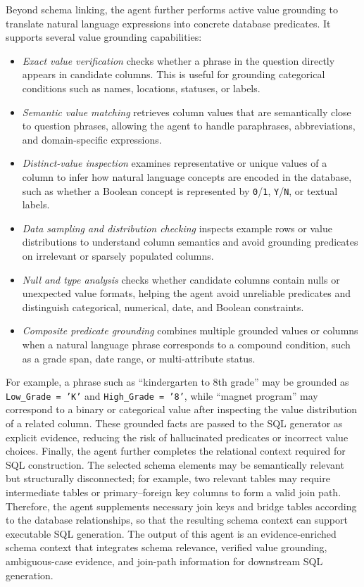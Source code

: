 Beyond schema linking, the agent further performs active value grounding to translate natural language expressions into concrete database predicates.
It supports several value grounding capabilities:

\begin{itemize}[leftmargin=10pt]
	\item \textit{Exact value verification} checks whether a phrase in the question directly appears in candidate columns.
	This is useful for grounding categorical conditions such as names, locations, statuses, or labels.
	
	\item \textit{Semantic value matching} retrieves column values that are semantically close to question phrases, allowing the agent to handle paraphrases, abbreviations, and domain-specific expressions.
	
	\item \textit{Distinct-value inspection} examines representative or unique values of a column to infer how natural language concepts are encoded in the database, such as whether a Boolean concept is represented by \texttt{0}/\texttt{1}, \texttt{Y}/\texttt{N}, or textual labels.
	
	\item \textit{Data sampling and distribution checking} inspects example rows or value distributions to understand column semantics and avoid grounding predicates on irrelevant or sparsely populated columns.
	
	\item \textit{Null and type analysis} checks whether candidate columns contain nulls or unexpected value formats, helping the agent avoid unreliable predicates and distinguish categorical, numerical, date, and Boolean constraints.
	
	\item \textit{Composite predicate grounding} combines multiple grounded values or columns when a natural language phrase corresponds to a compound condition, such as a grade span, date range, or multi-attribute status.
\end{itemize}

For example, a phrase such as ``kindergarten to 8th grade'' may be grounded as \texttt{Low\_Grade = 'K'} and \texttt{High\_Grade = '8'}, while ``magnet program'' may correspond to a binary or categorical value after inspecting the value distribution of a related column.
These grounded facts are passed to the SQL generator as explicit evidence, reducing the risk of hallucinated predicates or incorrect value choices.
Finally, the agent further completes the relational context required for SQL construction.
The selected schema elements may be semantically relevant but structurally disconnected; for example, two relevant tables may require intermediate tables or primary--foreign key columns to form a valid join path.
Therefore, the agent supplements necessary join keys and bridge tables according to the database relationships, so that the resulting schema context can support executable SQL generation.
The output of this agent is an evidence-enriched schema context that integrates schema relevance, verified value grounding, ambiguous-case evidence, and join-path information for downstream SQL generation.

